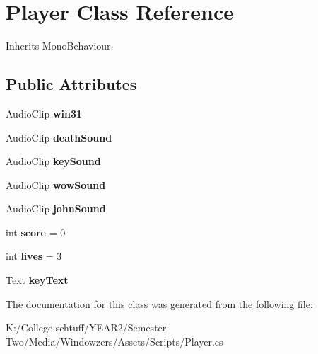 \hypertarget{class_player}{}\section{Player Class Reference}
\label{class_player}


Inherits Mono\+Behaviour.

\subsection*{Public Attributes}
\begin{DoxyCompactItemize}
\item 
\mbox{\label{class_player_accfd3fea46a20600a74fc7cd5c406ee8}} 
Audio\+Clip {\bfseries win31}
\item 
\mbox{\label{class_player_ae7e3ef47d26d260686c563b3fe200f6a}} 
Audio\+Clip {\bfseries death\+Sound}
\item 
\mbox{\label{class_player_aab17b56665d7f06a1e1d81837aa68cca}} 
Audio\+Clip {\bfseries key\+Sound}
\item 
\mbox{\label{class_player_a885c6011c498b107410573551c75c181}} 
Audio\+Clip {\bfseries wow\+Sound}
\item 
\mbox{\label{class_player_ad0a5a7dadc5574b22c2db38a95b7c143}} 
Audio\+Clip {\bfseries john\+Sound}
\item 
\mbox{\label{class_player_a43c38443fc6bbaf003e65a9408a329bf}} 
int {\bfseries score} = 0
\item 
\mbox{\label{class_player_a4f67cfa1eb59ace44ed72ec7dc2ff6b5}} 
int {\bfseries lives} = 3
\item 
\mbox{\label{class_player_af0e80a18416fe4ab0dd188649d20eea3}} 
Text {\bfseries key\+Text}
\end{DoxyCompactItemize}


The documentation for this class was generated from the following file\+:\begin{DoxyCompactItemize}
\item 
K\+:/\+College schtuff/\+Y\+E\+A\+R2/\+Semester Two/\+Media/\+Windowzers/\+Assets/\+Scripts/Player.\+cs\end{DoxyCompactItemize}
